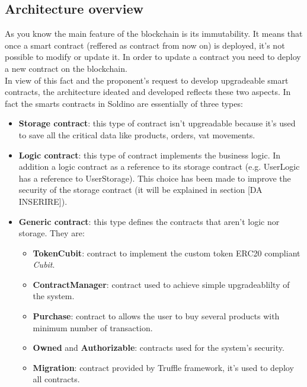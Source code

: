 \subsection{Architecture overview}
As you know the main feature of the blockchain is its immutability. It means that once a smart contract (reffered as contract from now on) is 
deployed, it's not possible to modify or update it. In order to update a contract you need to deploy 
a new contract on the blockchain.\\
In view of this fact and the proponent's request to develop upgradeable smart contracts, the architecture ideated and developed reflects these two aspects. In fact the smarts contracts in Soldino
are essentially of three types:
\begin{itemize}
	\item\textbf{Storage contract}: this type of contract isn't upgreadable because it's used
		to save all the critical data like products, orders, vat movements. 
	\item\textbf{Logic contract}: this type of contract implements the business logic. In addition
	a logic contract as a reference to its storage contract (e.g. UserLogic has a reference to UserStorage). This choice has been made to improve the security of the storage contract (it will be explained in section [DA INSERIRE]).
	\item\textbf{Generic contract}: this type defines the contracts that aren't logic nor storage.
	They are:
	\begin{itemize}
		\item\textbf{TokenCubit}: contract to implement the custom token ERC20 compliant \textit{Cubit}.
		\item\textbf{ContractManager}: contract used to achieve simple upgradeablilty of the system.
		\item\textbf{Purchase}: contract to allows the user to buy several products with minimum number of transaction.
		\item\textbf{Owned} and \textbf{Authorizable}: contracts used for the system's security.
		\item\textbf{Migration}: contract provided by Truffle framework, it's used to deploy all contracts. 
	\end{itemize}
\end{itemize}

